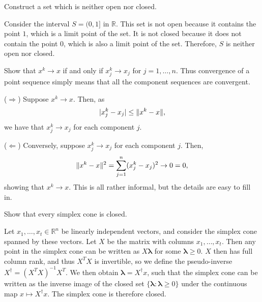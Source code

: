 \begin{exercise}
  Construct a set which is neither open nor closed.
\end{exercise}

\begin{solution}
  Consider the interval $S = (0, 1]$ in $\mathbb{R}$. %
  This set is not open because it contains the point $1$, which is a limit point of the set.
  It is not closed because it does not contain the point $0$, which is also a limit point of the set.
  Therefore, $S$ is neither open nor closed.
\end{solution}

\begin{exercise}
  Show that $x^k \to x$ if and only if $x_j^k \to x_j$ for $j = 1, \ldots, n$.
  Thus convergence of a point sequence simply means that all the component sequences are convergent.
\end{exercise}

\begin{solution}
  ($\Rightarrow$) Suppose $x^k \to x$.
  Then, as
  \begin{equation}
    \lvert x_j^k - x_j\rvert \leq \lVert x^k - x\rVert,
  \end{equation}
  we have that $x_j^k \to x_j$ for each component $j$.

  ($\Leftarrow$) Conversely, suppose $x_j^k \to x_j$ for each component $j$.
  Then,
  \begin{equation}
    \lVert x^k - x\rVert^2 = \sum_{j = 1}^{n} (x_j^k - x_j)^2 \to 0 = 0,
  \end{equation}
  showing that $x^k \to x$.
  This is all rather informal, but the details are easy to fill in.
\end{solution}

\begin{exercise}
  Show that every simplex cone is closed.
\end{exercise}

\begin{solution}
  Let $x_1, \ldots, x_t \in \mathbb{R}^n$ be linearly independent vectors, and consider the simplex cone spanned by these vectors.
  Let $X$ be the matrix with columns $x_1, \ldots, x_t$.
  Then any point in the simplex cone can be written as $X \boldsymbol{\lambda}$ for some $\boldsymbol{\lambda} \geq 0$.
  $X$ then has full column rank, and thus $X^T X$ is invertible, so we define the pseudo-inverse $X^\dagger = (X^T X)^{-1} X^T$.
  We then obtain $\boldsymbol{\lambda} = X^\dagger x$, such that the simplex cone can be written as the inverse image of the closed set $\{ \boldsymbol{\lambda} : \boldsymbol{\lambda} \geq 0 \}$ under the continuous map $x \mapsto X^\dagger x$.
  The simplex cone is therefore closed.
\end{solution}

